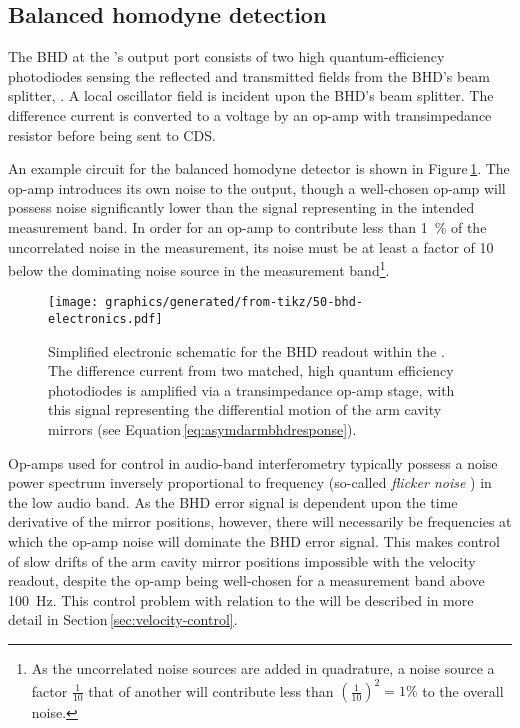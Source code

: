 \subsection{\label{sec:bhd}Balanced homodyne detection}
The \gls{BHD} at the \SSMEXPT{}'s output port consists of two high quantum-efficiency photodiodes sensing the reflected and transmitted fields from the \gls{BHD}'s beam splitter, \MSIXTEEN{}. A local oscillator field is incident upon the \gls{BHD}'s beam splitter. The difference current is converted to a voltage by an op-amp with transimpedance resistor \RT{} before being sent to \gls{CDS}.

An example circuit for the balanced homodyne detector is shown in Figure\,\ref{fig:bhd-electronics}. The op-amp introduces its own noise to the output, though a well-chosen op-amp will possess noise significantly lower than the signal representing \LMINUS{} in the intended measurement band. In order for an op-amp to contribute less than \SI{1}{\percent} of the uncorrelated noise in the measurement, its noise must be at least a factor of \SI{10}{} below the dominating noise source in the measurement band\footnote{As the uncorrelated noise sources are added in quadrature, a noise source a factor $\frac{1}{10}$ that of another will contribute less than $\left(\frac{1}{10}\right)^2 = 1\%$ to the overall noise.}.

\begin{figure}
  \centering
  \texttt{[image: graphics/generated/from-tikz/50-bhd-electronics.pdf]}
  \caption[Electronic schematic for the balanced homodyne readout]{\label{fig:bhd-electronics}Simplified electronic schematic for the BHD readout within the \SSMEXPT{}. The difference current from two matched, high quantum efficiency photodiodes is amplified via a transimpedance op-amp stage, with this signal representing the differential motion of the arm cavity mirrors (see Equation\,\ref{eq:asymdarmbhdresponse}).}
\end{figure}

Op-amps used for control in audio-band interferometry typically possess a noise power spectrum inversely proportional to frequency (so-called \emph{flicker noise} \cite[Section\,11.2.3]{Gray2009}) in the low audio band. As the \gls{BHD} error signal is dependent upon the time derivative of the mirror positions, however, there will necessarily be frequencies at which the op-amp noise will dominate the \gls{BHD} error signal. This makes control of slow drifts of the arm cavity mirror positions impossible with the velocity readout, despite the op-amp being well-chosen for a measurement band above \SI{100}{\hertz}. This control problem with relation to the \SSMEXPT{} will be described in more detail in Section\,\ref{sec:velocity-control}.

